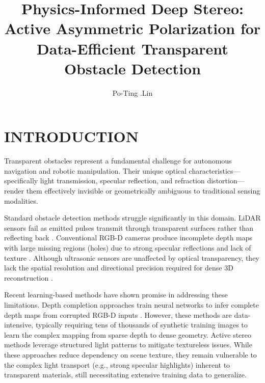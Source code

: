 \documentclass[letterpaper, 10 pt, conference]{ieeeconf}  %
\title{\LARGE \bf
Physics-Informed Deep Stereo: Active Asymmetric Polarization 
for Data-Efficient Transparent Obstacle Detection
}
\author{Po-Ting .Lin 
}
\begin{document}
\maketitle
\thispagestyle{empty}
\pagestyle{empty}


\begin{abstract}


\end{abstract}


\section{INTRODUCTION}

Transparent obstacles represent a fundamental challenge for autonomous navigation and robotic manipulation. Their unique optical characteristics—specifically light transmission, specular reflection, and refraction distortion—render them effectively invisible or geometrically ambiguous to traditional sensing modalities.

Standard obstacle detection methods struggle significantly in this domain. LiDAR sensors fail as emitted pulses transmit through transparent surfaces rather than reflecting back \cite{tibebu_lidar-based_2021}. Conventional RGB-D cameras produce incomplete depth maps with large missing regions (holes) due to strong specular reflections and lack of texture \cite{lysenkov_recognition_2013}. Although ultrasonic sensors are unaffected by optical transparency, they lack the spatial resolution and directional precision required for dense 3D reconstruction \cite{borenstein_vector_1991}.

Recent learning-based methods have shown promise in addressing these limitations. Depth completion approaches train neural networks to infer complete depth maps from corrupted RGB-D inputs \cite{sajjan_clear_2020}. However, these methods are data-intensive, typically requiring tens of thousands of synthetic training images to learn the complex mapping from sparse depth to dense geometry. Active stereo methods \cite{shi_asgrasp_2024} leverage structured light patterns to mitigate textureless issues. While these approaches reduce dependency on scene texture, they remain vulnerable to the complex light transport (e.g., strong specular highlights) inherent to transparent materials, still necessitating extensive training data to generalize.
\end{document}
